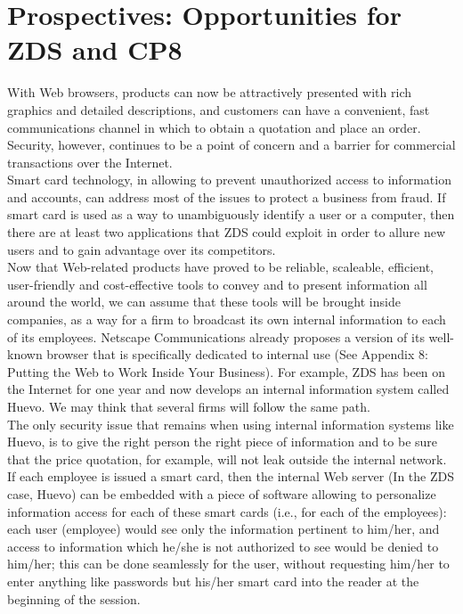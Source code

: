 \section{Prospectives: Opportunities for ZDS and CP8}
With Web browsers, products can now be attractively presented with rich
graphics and detailed descriptions, and customers can have a
convenient, fast communications channel in which to obtain a quotation
and place an order. Security, however, continues to be a point of
concern and a barrier for commercial transactions over the Internet.\\

Smart card technology, in allowing to prevent unauthorized access to
information and accounts, can address most of the issues to protect a
business from fraud. If smart card is used as a way to unambiguously
identify a user or a computer, then there are at least two applications
that ZDS could exploit in order to allure new users and to gain
advantage over its competitors.\\

Now that Web-related products have proved to be reliable, scaleable,
efficient, user-friendly and cost-effective tools to convey and to
present information all around the world, we can assume that these
tools will be brought inside companies, as a way for a firm to
broadcast its own internal information to each of its employees.
Netscape Communications already proposes a version of its well-known
browser that is specifically dedicated to internal use (See Appendix 8:
Putting the Web to Work Inside Your Business). For example, ZDS has
been on the Internet for one year and now develops an internal
information system called Huevo. We may think that several firms will
follow the same path.\\

The only security issue that remains when using internal information
systems like Huevo, is to give the right person the right piece of
information and to be sure that the price quotation, for example, will
not leak outside the internal network. If each employee is issued a
smart card, then the internal Web server (In the ZDS case, Huevo) can
be embedded with a piece of software allowing to personalize
information access for each of these smart cards (i.e., for each of the
employees): each user (employee) would see only the information
pertinent to him/her, and access to information which he/she is not
authorized to see would be denied to him/her; this can be done
seamlessly for the user, without requesting him/her to enter anything
like passwords but his/her smart card into the reader at the beginning
of the session.\\


